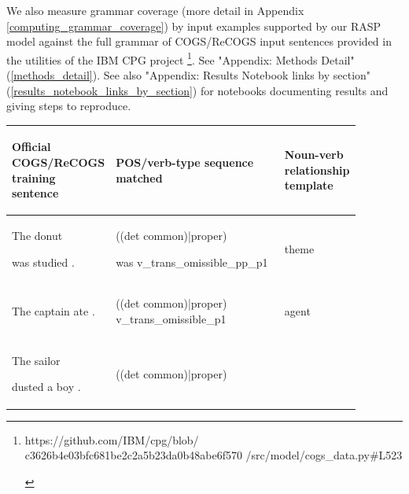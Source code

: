 \documentclass[11pt]{article}
\begin{document}
We also measure grammar coverage \cite{fuzzingbook2023:GrammarCoverageFuzzer} (more detail in Appendix \ref{computing_grammar_coverage}) by input examples supported by our RASP model against the full grammar of COGS/ReCOGS input sentences provided in the utilities of the IBM CPG project \cite{klinger2024compositionalprogramgenerationfewshot}\footnote{\begin{footnotesize}https://github.com/IBM/cpg/blob/
c3626b4e03bfc681be2c2a5b23da0b48abe6f570
/src/model/cogs\_data.py\#L523\end{footnotesize}}. See "Appendix: Methods Detail" (\ref{methods_detail}). See also "Appendix: Results Notebook links by section" (\ref{results_notebook_links_by_section}) for notebooks documenting results and giving steps to reproduce.
\clearpage
\begin{table}
\centering
\begin{tabular}{p{0.225\linewidth} p{0.50\linewidth} p{0.15\linewidth}}
\hline
\begin{tiny}\textbf{Official COGS/ReCOGS training sentence}\end{tiny} & \begin{tiny}\textbf{POS/verb-type sequence matched}\end{tiny} & \begin{tiny}\textbf{Noun-verb relationship template}\end{tiny}\\
\hline
\hline
\begin{tiny}The donut 

was studied .\end{tiny} & \begin{tiny}((det common)|proper)

was v\_trans\_omissible\_pp\_p1\end{tiny} & \begin{tiny}theme\end{tiny} \\
\hline
\begin{tiny}The captain ate .\end{tiny} & \begin{tiny}((det common)|proper) v\_trans\_omissible\_p1\end{tiny} & \begin{tiny}agent\end{tiny} \\
\hline
\begin{tiny}The sailor 

dusted a boy .\end{tiny} & \begin{tiny}((det common)|proper)


\end{tiny}
\end{tabular}
\end{table}
\end{document}
